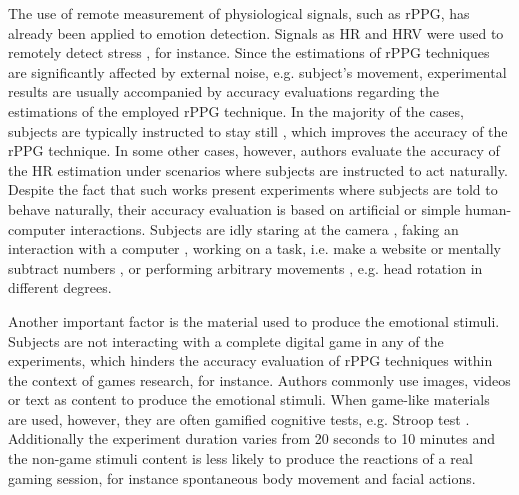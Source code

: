 The use of remote measurement of physiological signals, such as rPPG, has already been applied to emotion detection. Signals as HR and HRV were used to remotely detect stress \parencite{mcduffcogcam, mcduff2014improvements, bousefsaf2013remote}, for instance. Since the estimations of rPPG techniques are significantly affected by external noise, e.g. subject's movement, experimental results are usually accompanied by accuracy evaluations regarding the estimations of the employed rPPG technique. In the majority of the cases, subjects are typically instructed to stay still \parencite{rouast2016remote}, which improves the accuracy of the rPPG technique. In some other cases, however, authors evaluate the accuracy of the HR estimation under scenarios where subjects are instructed to act naturally. Despite the fact that such works present experiments where subjects are told to behave naturally, their accuracy evaluation is based on artificial or simple human-computer interactions. Subjects are idly staring at the camera \parencite{zhao2013remote,hsu2014learning}, faking an interaction with a computer \parencite{poh2010non}, working on a task, i.e. make a website \parencite{monkaresi2014machine} or mentally subtract numbers \parencite{mcduff2014remote}, or performing arbitrary movements \parencite{tran2015robust}, e.g. head rotation in different degrees.

Another important factor is the material used to produce the emotional stimuli. Subjects are not interacting with a complete digital game in any of the experiments, which hinders the accuracy evaluation of rPPG techniques within the context of games research, for instance. Authors commonly use images, videos or text as content to produce the emotional stimuli. When game-like materials are used, however, they are often gamified cognitive tests, e.g. Stroop test \parencite{golden1978stroop}. Additionally the experiment duration varies from 20 seconds to 10 minutes and the non-game stimuli content is less likely to produce the reactions of a real gaming session, for instance spontaneous body movement and facial actions.

